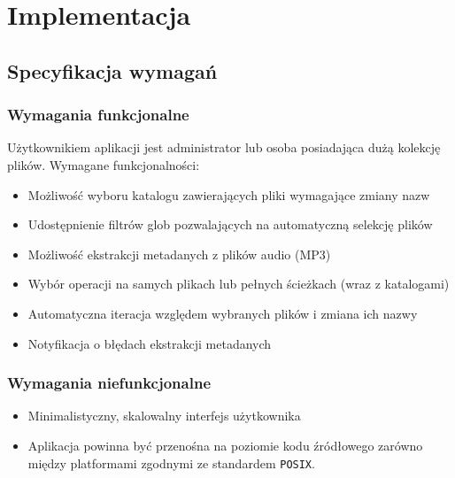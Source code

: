 \chapter{Implementacja}
\label{implementacja}

\section{Specyfikacja wymagań}
\label{specyfikacja-wymagan}

\subsection{Wymagania funkcjonalne}
Użytkownikiem aplikacji jest administrator lub osoba posiadająca dużą kolekcję plików.
Wymagane funkcjonalności:
\begin{itemize}
\item Możliwość wyboru katalogu zawierających pliki wymagające zmiany nazw
\item Udostępnienie filtrów glob pozwalających na automatyczną selekcję plików
\item Możliwość ekstrakcji metadanych z plików audio (MP3)
\item Wybór operacji na samych plikach lub pełnych ścieżkach (wraz z katalogami)
\item Automatyczna iteracja względem wybranych plików i zmiana ich nazwy
\item Notyfikacja o błędach ekstrakcji metadanych
\end{itemize}

\subsection{Wymagania niefunkcjonalne}
\begin{itemize}
\item Minimalistyczny, skalowalny interfejs użytkownika
\item Aplikacja powinna być przenośna na poziomie kodu źródłowego zarówno między platformami zgodnymi ze standardem \texttt{POSIX}.
\end{itemize}

